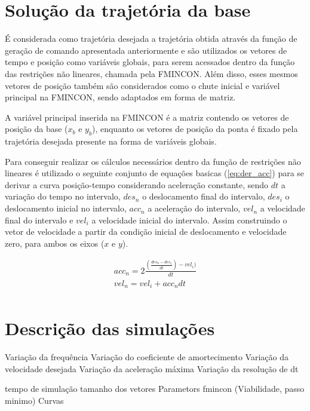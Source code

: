 \section{Solução da trajetória da base}

É considerada como trajetória desejada a trajetória obtida através da função de geração de comando apresentada anteriormente
e são utilizados os vetores de tempo e posição como variáveis globais, para serem acessados dentro da função das
restrições não lineares, chamada pela FMINCON.
Além disso, esses mesmos vetores de posição também são considerados como o chute inicial e variável principal
na FMINCON, sendo adaptados em forma de matriz.

A variável principal inserida na FMINCON é a matriz contendo os vetores de posição da base ($x_b$ e $y_b$),
enquanto os vetores de posição da ponta é fixado pela trajetória desejada presente na forma de variáveis globais.

Para conseguir realizar os cálculos necessários dentro da função de restrições não lineares é utilizado o seguinte conjunto
de equações basicas (\ref{eq:der_acc}) para se derivar a curva posição-tempo considerando aceleração constante,
sendo $dt$ a variação do tempo no intervalo, $des_n$ o deslocamento final do intervalo, $des_i$ o deslocamento inicial no intervalo,
$acc_n$ a aceleração do intervalo, $vel_n$ a velocidade final do intervalo e $vel_i$ a velocidade inicial do intervalo.
Assim construindo o vetor de velocidade a partir da condição inicial de deslocamento e velocidade zero, para ambos os eixos ($x$ e $y$).

\begin{equation}
    \label{eq:der_acc}
    \begin{split}        
        acc_n = 2\frac{(\frac{des_n-des_i}{dt})-vel_i)}{dt} \\
        vel_n = vel_i+acc_ndt \\
    \end{split}
\end{equation}

\section{Descrição das simulações}

Variação da frequência
Variação do coeficiente de amortecimento
Variação da velocidade desejada
Variação da aceleração máxima
Variação da resolução de dt

tempo de simulação
tamanho dos vetores
Parametors fmincon (Viabilidade, passo minimo)
Curvas
